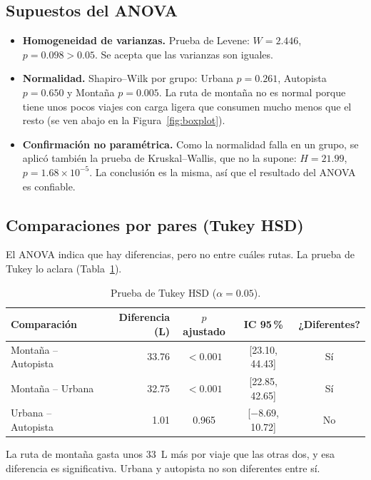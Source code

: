 \documentclass[12pt,letterpaper]{article}
\begin{document}
\subsection{Supuestos del ANOVA}

\begin{itemize}[itemsep=2pt]
  \item \textbf{Homogeneidad de varianzas.} Prueba de Levene: $W = 2.446$, $p = 0.098 > 0.05$. Se acepta que las varianzas son iguales.
  \item \textbf{Normalidad.} Shapiro--Wilk por grupo: Urbana $p = 0.261$, Autopista $p = 0.650$ y Montaña $p = 0.005$. La ruta de montaña no es normal porque tiene unos pocos viajes con carga ligera que consumen mucho menos que el resto (se ven abajo en la Figura~\ref{fig:boxplot}).
  \item \textbf{Confirmación no paramétrica.} Como la normalidad falla en un grupo, se aplicó también la prueba de Kruskal--Wallis, que no la supone: $H = 21.99$, $p = 1.68 \times 10^{-5}$. La conclusión es la misma, así que el resultado del ANOVA es confiable.
\end{itemize}

\subsection{Comparaciones por pares (Tukey HSD)}

El ANOVA indica que hay diferencias, pero no entre cuáles rutas. La prueba de Tukey lo aclara (Tabla~\ref{tab:tukey}).

\begin{table}[H]
\centering
\caption{Prueba de Tukey HSD ($\alpha = 0.05$).}
\label{tab:tukey}
\begin{tabular}{lrcc c}
\toprule
Comparación & Diferencia (L) & $p$ ajustado & IC 95\,\% & ¿Diferentes? \\
\midrule
Montaña -- Autopista & 33.76 & $< 0.001$ & [23.10, 44.43] & Sí \\
Montaña -- Urbana    & 32.75 & $< 0.001$ & [22.85, 42.65] & Sí \\
Urbana -- Autopista  &  1.01 & 0.965     & [$-8.69$, 10.72] & No \\
\bottomrule
\end{tabular}
\end{table}

La ruta de montaña gasta unos 33~L más por viaje que las otras dos, y esa diferencia es significativa. Urbana y autopista no son diferentes entre sí.
\end{document}
